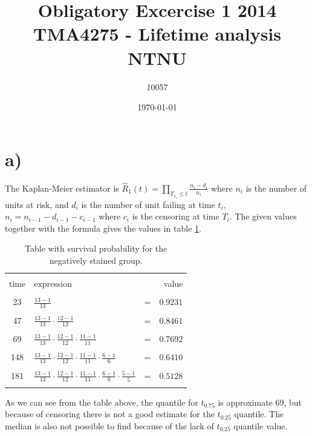 \documentclass[10pt, a4paper]{article}
\begin{document}
\title{Obligatory Excercise 1 2014\\
\normalsize TMA4275 - Lifetime analysis\\
			NTNU}
\author{10057}
\date{\today}

\begin{titlepage}
\maketitle
\thispagestyle{empty}
\end{titlepage}

\section*{a)}
The Kaplan-Meier estimator is $ \hat{R}_1(t) = \prod \limits_{T_{1_i} \leq t} \frac{n_i-d_i}{n_i} $ where $ n_i $ is the number of units at risk, and $ d_i $ is the number of unit failing at time $t_i$, $ n_i = n_{i-1}-d_{i-1}-c_{i-1} $ where $ c_i $ is the censoring at time $T_i$.
The given values together with the formula gives the values in table \ref{r1hatt}.
\begin{center}
\begin{table}[h!]
\centering
\begin{tabular}{ c l c r }
& & & \\
time & expression & & value \\ & & \\
23 &  $ \frac{13-1}{13} $ & = & $ 0.9231 $\\ & & \\
47 &  $ \frac{13-1}{13}\cdot\frac{12-1}{12} $ & = & $ 0.8461 $\\ & & \\
69 &  $ \frac{13-1}{13}\cdot\frac{12-1}{12}\cdot\frac{11-1}{11} $ & = & $ 0.7692$ \\ & & \\
148 &  $ \frac{13-1}{13}\cdot\frac{12-1}{12}\cdot\frac{11-1}{11}\cdot\frac{6-1}{6} $ & = & $0.6410$ \\ & & \\
181 &  $ \frac{13-1}{13}\cdot\frac{12-1}{12}\cdot\frac{11-1}{11}\cdot\frac{6-1}{6}\cdot\frac{5-1}{5} $ & = & $ 0.5128 $\\
   & & \\

\end{tabular}
\caption{Table with survival probability for the negatively stained group.}
\label{r1hatt}
\end{table}
\end{center}
As we can see from the table above, the quantile for $t_{0.75}$ is approximate 69, but because of censoring there is not a good estimate for the $ t_{0.25}$ quantile. The median is also not possible to find because of the lack of $t_{0.25}$ quantile value.\\ 
\end{document}
